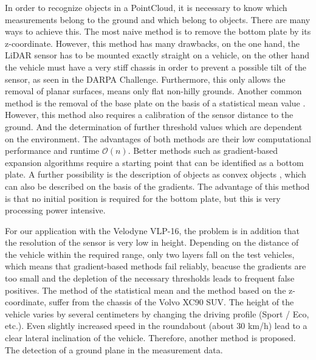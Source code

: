\documentclass[11pt,oneside,openright]{mpreport}
\begin{document}
In order to recognize objects in a PointCloud, it is necessary to know which measurements belong to the ground and which belong to objects.
There are many ways to achieve this. The most naive method is to remove the bottom plate by its z-coordinate.
However, this method has many drawbacks, on the one hand, the LiDAR sensor has to be mounted exactly straight on a vehicle, 
on the other hand the vehicle must have a very stiff chassis in order to prevent a possible tilt of the sensor, as seen in the \ac{DARPA} Challenge.
Furthermore, this only allows the removal of planar surfaces, means only flat non-hilly grounds. 
Another common method is the removal of the base plate on the basis of a statistical mean value \cite{Zhang}.
However, this method also requires a calibration of the sensor distance to the ground. 
And the determination of further threshold values which are dependent on the environment.
The advantages of both methods are their low computational performance and runtime $\mathcal{O}(n)$.
Better methods such as gradient-based expansion algorithms require a starting point that can be identified as a bottom plate.
A further possibility is the description of objects as convex objects \cite{5164280}, which can also be described on the basis of the gradients.
The advantage of this method is that no initial position is required for the bottom plate, but this is very processing power intensive.
% 

For our application with the Velodyne VLP-16, the problem is in addition that the resolution of the sensor is very low in height.
Depending on the distance of the vehicle within the required range, only two layers fall on the test vehicles, which means that gradient-based methods fail reliably,
beacuse the gradients are too small and the depletion of the necessary thresholds leads to frequent false positives. 
The method of the statistical mean and the method based on the z-coordinate, suffer from the chassis of the Volvo XC90 SUV. 
The height of the vehicle varies by several centimeters by changing the driving profile (Sport / Eco, etc.). Even slightly increased speed in the roundabout (about 30 km/h)
lead to a clear lateral inclination of the vehicle. Therefore, another method is proposed. The detection of a ground plane in the measurement data.
\end{document}

